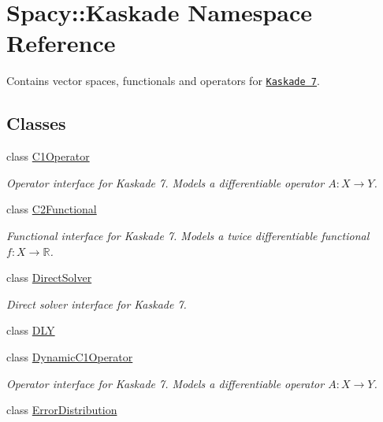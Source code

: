 \hypertarget{namespaceSpacy_1_1Kaskade}{}\section{Spacy\+:\+:Kaskade Namespace Reference}
\label{namespaceSpacy_1_1Kaskade}


Contains vector spaces, functionals and operators for \href{http://www.zib.de/projects/kaskade7-finite-element-toolbox}{\tt Kaskade 7}.  


\subsection*{Classes}
\begin{DoxyCompactItemize}
\item 
class \hyperlink{classSpacy_1_1Kaskade_1_1C1Operator}{C1\+Operator}
\begin{DoxyCompactList}\small\item\em Operator interface for Kaskade 7. Models a differentiable operator $A:X\rightarrow Y$. \end{DoxyCompactList}\item 
class \hyperlink{classSpacy_1_1Kaskade_1_1C2Functional}{C2\+Functional}
\begin{DoxyCompactList}\small\item\em Functional interface for Kaskade 7. Models a twice differentiable functional $f:X\rightarrow \mathbb{R}$. \end{DoxyCompactList}\item 
class \hyperlink{classSpacy_1_1Kaskade_1_1DirectSolver}{Direct\+Solver}
\begin{DoxyCompactList}\small\item\em Direct solver interface for Kaskade 7. \end{DoxyCompactList}\item 
class \hyperlink{classSpacy_1_1Kaskade_1_1DLY}{D\+L\+Y}
\item 
class \hyperlink{classSpacy_1_1Kaskade_1_1DynamicC1Operator}{Dynamic\+C1\+Operator}
\begin{DoxyCompactList}\small\item\em Operator interface for Kaskade 7. Models a differentiable operator $A:X\rightarrow Y$. \end{DoxyCompactList}\item 
class \hyperlink{classSpacy_1_1Kaskade_1_1ErrorDistribution}{Error\+Distribution}
\item 

\end{DoxyCompactItemize}
